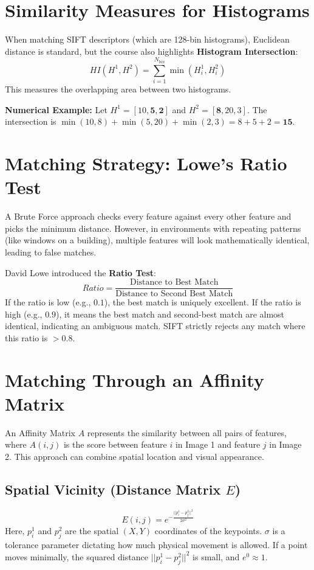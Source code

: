 \documentclass{report}
\begin{document}
\section{Similarity Measures for Histograms}
When matching SIFT descriptors (which are 128-bin histograms), Euclidean distance is standard, but the course also highlights \textbf{Histogram Intersection}:
\begin{equation}
    HI(H^1,H^2) = \sum_{i=1}^{N_{bin}} \min(H_i^1, H_i^2)
\end{equation}
This measures the overlapping area between two histograms.

\textbf{Numerical Example:}
Let $H^1 = [10, \mathbf{5}, \mathbf{2}]$ and $H^2 = [\mathbf{8}, 20, 3]$.
The intersection is $\min(10,8) + \min(5,20) + \min(2,3) = 8 + 5 + 2 = \mathbf{15}$.

\section{Matching Strategy: Lowe's Ratio Test}
A Brute Force approach checks every feature against every other feature and picks the minimum distance. However, in environments with repeating patterns (like windows on a building), multiple features will look mathematically identical, leading to false matches.

David Lowe introduced the \textbf{Ratio Test}:
\begin{equation}
    Ratio = \frac{\text{Distance to Best Match}}{\text{Distance to Second Best Match}}
\end{equation}
If the ratio is low (e.g., $0.1$), the best match is uniquely excellent. If the ratio is high (e.g., $0.9$), it means the best match and second-best match are almost identical, indicating an ambiguous match. SIFT strictly rejects any match where this ratio is $> 0.8$.

\section{Matching Through an Affinity Matrix}
An Affinity Matrix $A$ represents the similarity between all pairs of features, where $A(i,j)$ is the score between feature $i$ in Image 1 and feature $j$ in Image 2. This approach can combine spatial location and visual appearance.

\subsection{Spatial Vicinity (Distance Matrix $E$)}
\begin{equation}
    E(i,j) = e^{-\frac{||p_i^1 - p_j^2||^2}{2\sigma^2}}
\end{equation}
Here, $p_i^1$ and $p_j^2$ are the spatial $(X, Y)$ coordinates of the keypoints. $\sigma$ is a tolerance parameter dictating how much physical movement is allowed. If a point moves minimally, the squared distance $||p_i^1 - p_j^2||^2$ is small, and $e^0 \approx 1$.
\end{document}
